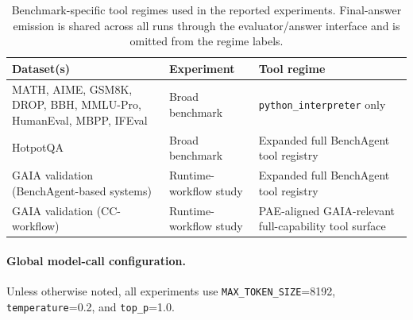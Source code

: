 \begin{table}[t]
    \centering
    \caption{Benchmark-specific tool regimes used in the reported experiments. Final-answer emission is shared across all runs through the evaluator/answer interface and is omitted from the regime labels.}
    \label{tab:appendix_tool_regimes}
    \footnotesize
    \setlength{\tabcolsep}{5pt}
    \renewcommand{\arraystretch}{1.08}
    \begin{tabular}{>{\raggedright\arraybackslash}p{} >{\raggedright\arraybackslash}p{} >{\raggedright\arraybackslash}p{}}
        \toprule
        \textbf{Dataset(s)} & \textbf{Experiment} & \textbf{Tool regime} \\
        \midrule
        MATH, AIME, GSM8K, DROP, BBH, MMLU-Pro, HumanEval, MBPP, IFEval & Broad benchmark & \texttt{python\_interpreter} only \\
        HotpotQA & Broad benchmark & Expanded full BenchAgent tool registry \\
        GAIA validation (BenchAgent-based systems) & Runtime-workflow study & Expanded full BenchAgent tool registry \\
        GAIA validation (CC-workflow) & Runtime-workflow study & PAE-aligned GAIA-relevant full-capability tool surface \\
        \bottomrule
    \end{tabular}
\end{table}

\paragraph{Global model-call configuration.}
Unless otherwise noted, all experiments use \texttt{MAX\_TOKEN\_SIZE}=8192, \texttt{temperature}=0.2, and \texttt{top\_p}=1.0.

